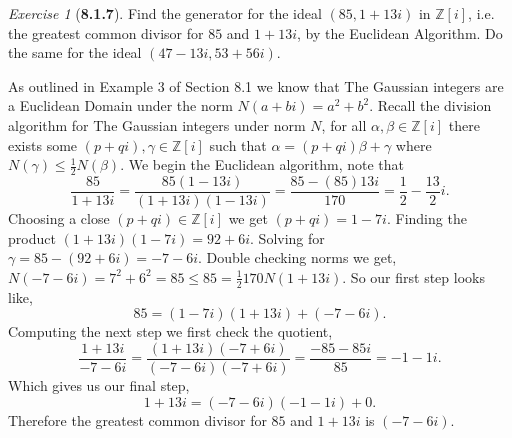 \documentclass[12pt]{amsart}
\makeatletter
\theoremstyle{remark}
\newtheorem*{exercise}{Exercise}%
\def\ZZ{\ensuremath{\mathbb Z}}
\renewenvironment{proof}[1][\proofname]{\par\doublespacing
  \pushQED{\qed}%
  \normalfont \topsep6\p@\@plus6\p@\relax
  \list{}{%
    \settowidth{\leftmargin}{\itshape\proofname:\hskip\labelsep}%
    \setlength{\labelwidth}{0pt}%
    \setlength{\itemindent}{-\leftmargin}%
  }%
  \item[\hskip\labelsep\itshape#1\@addpunct{:}]\ignorespaces
}{%
  \popQED\endlist\@endpefalse
  \singlespacing
}
\theoremstyle{mycomment}
\makeatother
\begin{document}
\begin{exercise}[\textbf{8.1.7}] Find the generator for the ideal $(85, 1 + 13i)$ in $\ZZ[i]$, i.e. the greatest common divisor for $85$
  and $1 + 13i$, by the Euclidean Algorithm. Do the same for the ideal $(47 - 13i, 53 + 56i)$.
    \begin{proof}[Solution] As outlined in Example $3$ of Section 8.1 we know that The Gaussian integers are a Euclidean Domain under the norm $N(a + bi) = a^2 + b^2$. 
      Recall the division algorithm for The Gaussian integers under norm $N$, for all $\alpha, \beta \in \ZZ[i]$ there exists some $(p + qi), \gamma \in \ZZ[i]$ such that 
      $\alpha = (p + qi)\beta + \gamma$ where $N(\gamma) \leq \frac{1}{2}N(\beta)$. 
      We begin the Euclidean algorithm, note that 
      \begin{equation*}
        \frac{85}{1 + 13i} = \frac{85(1 - 13i)}{(1 + 13i)(1 - 13i)} = \frac{85 - (85)13i}{170} = \frac{1}{2} - \frac{13}{2}i. 
      \end{equation*}
      Choosing a close $(p + qi) \in \ZZ[i]$ we get $(p + qi) = 1 - 7i$. Finding the product $(1 + 13i)(1 - 7i) = 92 + 6i$. Solving for $\gamma = 85 - (92 + 6i) = -7 - 6i$.
      Double checking norms we get, $N(-7 - 6i) = 7^2 + 6^2 = 85 \leq 85 = \frac{1}{2}170 N(1 + 13i)$. 
      So our first step looks like, 
      \begin{equation*}
        85 = (1 - 7i)(1 + 13i) + (-7 - 6i).
      \end{equation*}
      Computing the next step we first check the quotient,
      \begin{equation*}
        \frac{1 + 13i}{-7 - 6i} = \frac{(1 + 13i)(-7 + 6i)}{(-7 - 6i)(-7 + 6i)} = \frac{-85 - 85i}{85} = -1 - 1i.
      \end{equation*}
      Which gives us our final step, 
      \begin{equation*}
        1 + 13i = (-7 - 6i)(-1 - 1i) + 0.
      \end{equation*}
      Therefore the greatest common divisor for $85$ and $1 + 13i$ is $(-7 - 6i)$.\\\\


\end{proof}
\end{exercise}
\end{document}
